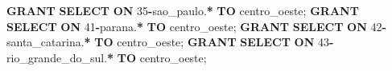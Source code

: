 \documentclass[
]{book}
\newenvironment{Shaded}{\begin{snugshade}}{\end{snugshade}}
\newcommand{\DecValTok}[1]{\textcolor[rgb]{0.00,0.00,0.81}{#1}}
\newcommand{\KeywordTok}[1]{\textcolor[rgb]{0.13,0.29,0.53}{\textbf{#1}}}
\newcommand{\NormalTok}[1]{#1}
\newcommand{\OperatorTok}[1]{\textcolor[rgb]{0.81,0.36,0.00}{\textbf{#1}}}
\newcommand{\StringTok}[1]{\textcolor[rgb]{0.31,0.60,0.02}{#1}}
\begin{document}
\begin{Shaded}
\begin{Highlighting}[]
\KeywordTok{GRANT} \KeywordTok{SELECT} \KeywordTok{ON}\NormalTok{ \textasciigrave{}}\DecValTok{35}\OperatorTok{{-}}\NormalTok{sao\_paulo\textasciigrave{}.}\OperatorTok{*}          \KeywordTok{TO} \StringTok{\textquotesingle{}centro\_oeste\textquotesingle{}}\NormalTok{;}
\KeywordTok{GRANT} \KeywordTok{SELECT} \KeywordTok{ON}\NormalTok{ \textasciigrave{}}\DecValTok{41}\OperatorTok{{-}}\NormalTok{parana\textasciigrave{}.}\OperatorTok{*}             \KeywordTok{TO} \StringTok{\textquotesingle{}centro\_oeste\textquotesingle{}}\NormalTok{;}
\KeywordTok{GRANT} \KeywordTok{SELECT} \KeywordTok{ON}\NormalTok{ \textasciigrave{}}\DecValTok{42}\OperatorTok{{-}}\NormalTok{santa\_catarina\textasciigrave{}.}\OperatorTok{*}     \KeywordTok{TO} \StringTok{\textquotesingle{}centro\_oeste\textquotesingle{}}\NormalTok{;}
\KeywordTok{GRANT} \KeywordTok{SELECT} \KeywordTok{ON}\NormalTok{ \textasciigrave{}}\DecValTok{43}\OperatorTok{{-}}\NormalTok{rio\_grande\_do\_sul\textasciigrave{}.}\OperatorTok{*}  \KeywordTok{TO} \StringTok{\textquotesingle{}centro\_oeste\textquotesingle{}}\NormalTok{;}


\end{Highlighting}
\end{Shaded}
\end{document}
